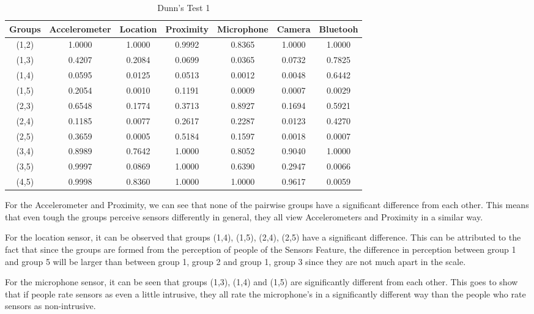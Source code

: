 \begin{table}[h!]
  \centering
  \caption{Dunn's Test 1}
  \label{tab:dunn_sensors}
  \begin{tabular}{ccccccc}
    \toprule
     Groups & Accelerometer & Location & Proximity & Microphone & Camera & Bluetooh \\
    \midrule
    (1,2) & 1.0000 & 1.0000 & 0.9992 & 0.8365 & 1.0000 & 1.0000 \\
    (1,3) & 0.4207 & 0.2084 & 0.0699 & 0.0365 & 0.0732 & 0.7825 \\
    (1,4) & 0.0595 & 0.0125 & 0.0513 & 0.0012 & 0.0048 & 0.6442 \\
    (1,5) & 0.2054 & 0.0010 & 0.1191 & 0.0009 & 0.0007 & 0.0029 \\
    (2,3) & 0.6548 & 0.1774 & 0.3713 & 0.8927 & 0.1694 & 0.5921 \\
    (2,4) & 0.1185 & 0.0077 & 0.2617 & 0.2287 & 0.0123 & 0.4270 \\
    (2,5) & 0.3659 & 0.0005 & 0.5184 & 0.1597 & 0.0018 & 0.0007 \\
    (3,4) & 0.8989 & 0.7642 & 1.0000 & 0.8052 & 0.9040 & 1.0000 \\
    (3,5) & 0.9997 & 0.0869 & 1.0000 & 0.6390 & 0.2947 & 0.0066 \\
    (4,5) & 0.9998 & 0.8360 & 1.0000 & 1.0000 & 0.9617 & 0.0059 \\
    \bottomrule
  \end{tabular}
\end{table} 

For the Accelerometer and Proximity, we can see that none of the pairwise groups have a significant difference from each other. This means that even tough the groups perceive sensors differently in general, they all view Accelerometers and Proximity in a similar way. 

For the location sensor, it can be observed that groups (1,4), (1,5), (2,4), (2,5) have a significant difference. This can be attributed to the fact that since the groups are formed from the perception of people of the Sensors Feature, the difference in perception between group 1 and group 5 will be larger than between group 1, group 2 and group 1, group 3 since they are not much apart in the scale.

For the microphone sensor, it can be seen that groups (1,3), (1,4) and (1,5) are significantly different from each other. This goes to show that
if people rate sensors as even a little intrusive, they all rate the microphone's in a significantly different way than the people who rate sensors as non-intrusive.


